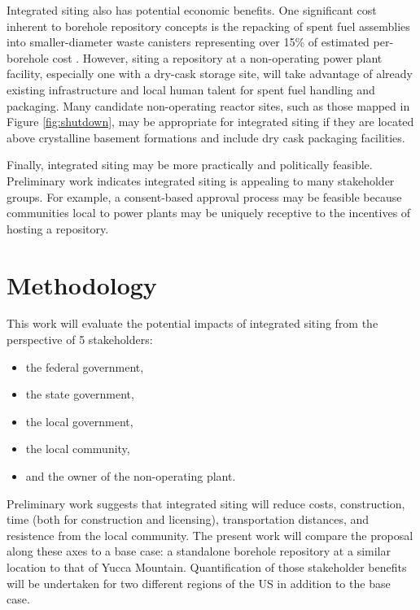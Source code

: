 Integrated siting also has potential economic benefits. One significant cost 
inherent to borehole repository concepts is the repacking of spent fuel 
assemblies into smaller-diameter waste canisters representing over 15\% of 
estimated per-borehole cost \cite{arnold_reference_2011}.  However, siting a 
repository at a non-operating power plant facility, especially one with a 
dry-cask storage site, will take advantage of already existing infrastructure 
and local human talent for spent fuel handling and packaging. Many candidate 
non-operating reactor sites, such as those mapped in Figure \ref{fig:shutdown}, 
may be appropriate for integrated siting if they are located above crystalline 
basement formations and include dry cask packaging facilities.

Finally, integrated siting may be more practically and politically feasible. 
Preliminary work \cite{waleed_regional_2015} indicates integrated siting is 
appealing to many stakeholder groups. For example, a consent-based approval 
process may be feasible because communities local to power plants may be 
uniquely receptive to the incentives of hosting a repository.  


\section{Methodology}

This work will evaluate the potential impacts of integrated siting from the 
perspective of 5 stakeholders:
\begin{itemize}
        \item the federal government,
        \item the state government,
        \item the local government,
        \item the local community,
        \item and the owner of the non-operating plant.
\end{itemize}


Preliminary work \cite{waleed_regional_2015} suggests that integrated siting 
will reduce costs, construction, time (both for construction and licensing), 
transportation distances, and resistence from the local community.  The present 
work will compare the proposal along these axes to a base case: a standalone 
borehole repository at a similar location to that of Yucca Mountain.  
Quantification of those stakeholder benefits will be undertaken for two 
different regions of the US in addition to the base case.  

